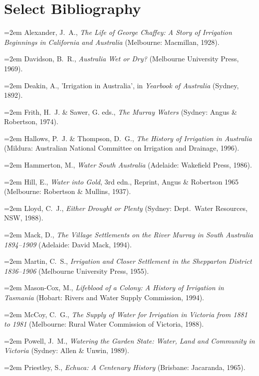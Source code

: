 %

\def\refitem{\noindent\hangindent=2em}

\chapter{Select Bibliography}

\refitem
Alexander, J.~A., {\em The Life of {George} {Chaffey}: A Story of Irrigation
  Beginnings in {California} and {Australia}\/} (Melbourne: Macmillan, 1928).

\refitem
Davidson, B.~R., {\em Australia Wet or Dry?\/} (Melbourne University Press,
  1969).

\refitem
Deakin, A., 'Irrigation in {Australia}', in {\em Yearbook of Australia\/}
  (Sydney, 1892).

\refitem
Frith, H.~J. \& Sawer, G. eds., {\em {The} {Murray} Waters\/}
  (Sydney: Angus \& Robertson, 1974).

\refitem
Hallows, P.~J. \& Thompson, D.~G., {\em The History of Irrigation in
  {Australia}\/} (Mildura: Australian National Committee on Irrigation and
  Drainage, 1996).

\refitem
Hammerton, M., {\em Water {South} {Australia}\/} (Adelaide: Wakefield Press,
  1986).

\refitem
Hill, E., {\em Water into Gold\/}, 3rd edn., Reprint, Angus \& Robertson 1965
  (Melbourne: Robertson \& Mullins, 1937).

\refitem
Lloyd, C.~J., {\em Either Drought or Plenty\/} (Sydney: Dept.\ Water Resources,
  NSW, 1988).

\refitem
Mack, D., {\em The Village Settlements on the {River} {Murray} in {South}
  {Australia} 1894--1909\/} (Adelaide: David Mack, 1994).

\refitem
Martin, C.~S., {\em Irrigation and Closer Settlement in the {Shepparton}
  District 1836--1906\/} (Melbourne University Press, 1955).

\refitem
Mason-Cox, M., {\em Lifeblood of a Colony: A History of Irrigation in
  {Tasmania}\/} (Hobart: Rivers and Water Supply Commission, 1994).

\refitem
McCoy, C.~G., {\em The Supply of Water for Irrigation in {Victoria} from 1881
  to 1981\/} (Melbourne: Rural Water Commission of Victoria, 1988).

\refitem
Powell, J.~M., {\em Watering the Garden State: Water, Land and Community in
  {Victoria}\/} (Sydney: Allen \& Unwin, 1989).

\refitem
Priestley, S., {\em Echuca: A Centenary History\/} (Brisbane: Jacaranda, 1965).


